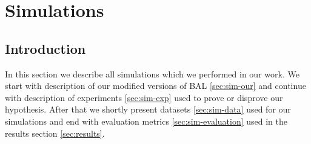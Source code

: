 
\section{Simulations}
\label{sec:simulations} 

\subsection*{Introduction} 
In this section we describe all simulations which we performed in our work. We start with description of our modified versions of BAL \ref{sec:sim-our} and continue with description of experiments \ref{sec:sim-exp} used to prove or disprove our hypothesis. After that we shortly present datasets \ref{sec:sim-data} used for our simulations and end with evaluation metrics \ref{sec:sim-evaluation} used in the results section \ref{sec:results}. 

 

 



 
